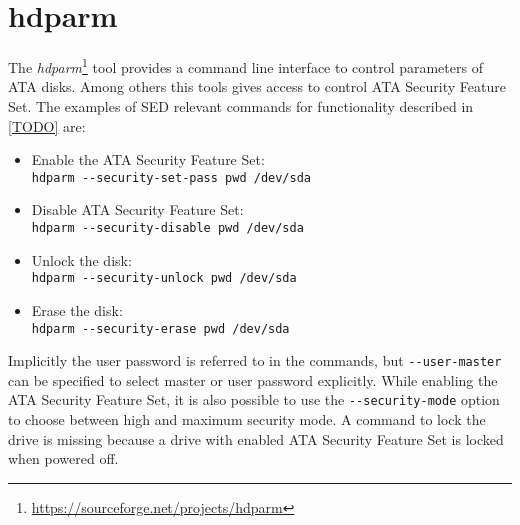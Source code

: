 




\section{hdparm}
 
The \emph{hdparm}\footnote{\url{https://sourceforge.net/projects/hdparm}} tool provides a command line interface to control parameters of ATA disks. Among others this tools gives access to control ATA Security Feature Set.
The examples of SED relevant commands for functionality described in \ref{TODO} are:
\begin{itemize}
\item Enable the ATA Security Feature Set:\\ \verb|hdparm --security-set-pass pwd /dev/sda|
\item Disable ATA Security Feature Set:\\ \verb|hdparm --security-disable pwd /dev/sda|
\item Unlock the disk:\\ \verb|hdparm --security-unlock pwd /dev/sda|
\item Erase the disk:\\ \verb|hdparm --security-erase pwd /dev/sda|
\end{itemize}
Implicitly the user password is referred to in the commands, but \verb|--user-master| can be specified to select master or user password explicitly. While enabling the ATA Security Feature Set, it is also possible to use the \verb|--security-mode| option to choose between high and maximum security mode.
A command to lock the drive is missing because a drive with enabled ATA Security Feature Set is locked when powered off.

